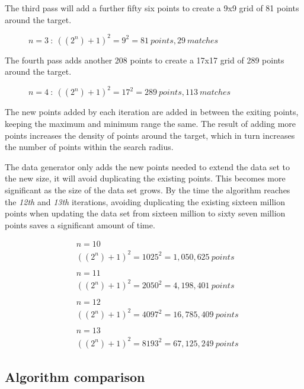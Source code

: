 \documentclass{article}
\begin{document}
The third pass will add a further fifty six points to create a 9x9 grid of 81 points around the target. 
\begin{figure}[h]

\caption{$n=3 \ :\ ((2^n)+1)^2 = 9^2 = 81 \ points, 29 \ matches$}
\label{fig:data-count-03}
\end{figure}

The fourth pass adds another 208 points to create a 17x17 grid of 289 points around the target. 
\begin{figure}[h]

\caption{$n=4 \ :\ ((2^n)+1)^2 = 17^2 = 289 \ points, 113 \ matches$}
\label{fig:data-count-04}
\end{figure}

The new points added by each iteration are added in between the exiting points, keeping the maximum and minimum range the same. The result of adding more points increases the density of points around the target, which in turn increases the number of points within the search radius.

The data generator only adds the new points needed to extend the data set to the new size, it will avoid duplicating the existing points.
This becomes more significant as the size of the data set grows. By the time the algorithm reaches the \textit{12th} and \textit{13th} iterations, avoiding duplicating the existing sixteen million points when updating the data set from sixteen million to sixty seven million points saves a significant amount of time.

\begin{equation*}
\begin{split}
& n = 10\\
& ((2^n)+1)^2 = 1025^2 = 1,050,625 \ points
\\
\\
& n = 11\\
& ((2^n)+1)^2 = 2050^2 = 4,198,401 \ points
\\
\\
& n = 12\\
& ((2^n)+1)^2 = 4097^2 = 16,785,409 \ points
\\
\\
& n = 13\\
& ((2^n)+1)^2 = 8193^2 = 67,125,249 \ points
\end{split}
\end{equation*}

\subsection{Algorithm comparison}
\label{database-algorithms}
\end{document}
